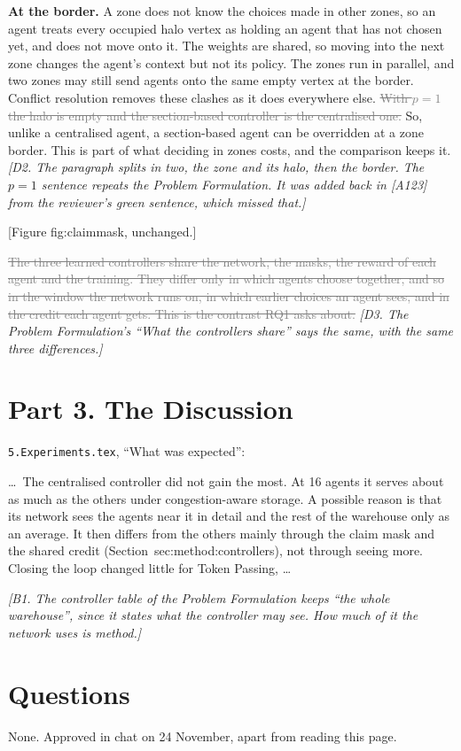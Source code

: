 \documentclass[11pt,a4paper]{article}
\newcommand{\new}[1]{\textcolor{newc}{#1}}
\newcommand{\old}[1]{\textcolor{gray}{\sout{#1}}}
\newcommand{\note}[1]{{\small\itshape [#1]}}
\newcommand{\lab}[1]{\textsf{\footnotesize #1}}
\renewcommand{\ref}[1]{\lab{#1}}
\begin{document}
\new{\textbf{At the border.}} A zone does not know the choices made in other
zones, so an agent treats every occupied halo vertex as holding an agent that
has not chosen yet, and does not move onto it. The weights are shared, so
moving into the next zone changes the agent's context but not its policy. The
zones run in parallel, and two zones may still send agents onto the same
empty vertex at the border. Conflict resolution removes these clashes as it
does everywhere else. \old{With $p=1$ the halo is empty and the
section-based controller is the centralised one.} So, unlike a centralised
agent, a section-based agent can be overridden at a zone border. This is
part of what deciding in zones costs, and the comparison keeps it.
\note{D2. The paragraph splits in two, the zone and its halo, then the
border. The $p=1$ sentence repeats the Problem Formulation. It was added
back in [A123] from the reviewer's green sentence, which missed that.}

[Figure \lab{fig:claimmask}, unchanged.]

\old{The three learned controllers share the network, the masks, the reward
of each agent and the training. They differ only in which agents choose
together, and so in the window the network runs on, in which earlier choices
an agent sees, and in the credit each agent gets. This is the contrast RQ1
asks about.} \note{D3. The Problem Formulation's ``What the controllers
share'' says the same, with the same three differences.}

\section*{Part 3. The Discussion}
\texttt{5.Experiments.tex}, ``What was expected'':

\dots\ The centralised controller did not gain the most. At 16 agents it
serves about as much as the others under congestion-aware storage. \new{A
possible reason is that its network sees the agents near it in detail and
the rest of the warehouse only as an average. It then differs from the
others mainly through the claim mask and the shared credit
(Section~\ref{sec:method:controllers}), not through seeing more.} Closing
the loop changed little for Token Passing, \dots

\note{B1. The controller table of the Problem Formulation keeps ``the whole
warehouse'', since it states what the controller may see. How much of it the
network uses is method.}

\section*{Questions}
None. Approved in chat on 24 November, apart from reading this page.
\end{document}
